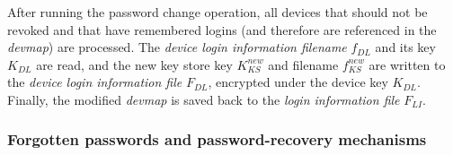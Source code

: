  After running the password change
operation, all devices that should not be revoked and that have remembered
logins (and therefore are referenced in the \textit{devmap}) are
processed. The \textit{device login information filename} $f_{DL}$ and its key $K_{DL}$ are read,
and the new key store key $K_{KS}^{new}$ and filename $f_{KS}^{new}$ are written to the
\textit{device login information file} $F_{DL}$, encrypted under the device key $K_{DL}$.
Finally, the modified \textit{devmap} is saved back to the \textit{login
information file} $F_{LI}$.


\subsubsection{Forgotten passwords and password-recovery mechanisms}

